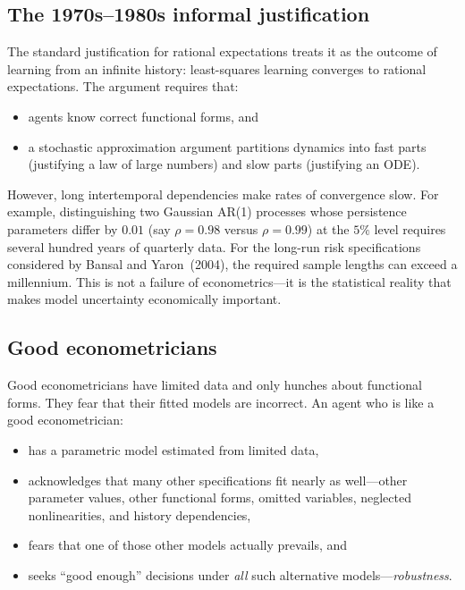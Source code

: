 \documentclass[12pt]{article}
\theoremstyle{definition}
\begin{document}
\subsection{The 1970s--1980s informal justification}

The standard justification for rational expectations treats it as the
outcome of learning from an infinite history: least-squares learning
converges to rational expectations.  The argument requires that:
\begin{itemize}
\item agents know correct functional forms, and
\item a stochastic approximation argument partitions dynamics into fast
      parts (justifying a law of large numbers) and slow parts
      (justifying an ODE).
\end{itemize}
However, long intertemporal dependencies make
{\color{red} rates of convergence slow}.
For example, distinguishing two Gaussian AR(1) processes whose
persistence parameters differ by $0.01$ (say $\rho = 0.98$ versus
$\rho = 0.99$) at the $5\%$ level requires several hundred years of
quarterly data.  For the long-run risk specifications considered by
Bansal and Yaron~(2004), the required sample lengths can exceed a
millennium.  This is not a failure of econometrics---it is the
statistical reality that makes model uncertainty economically important.

\subsection{Good econometricians}

Good econometricians have limited data and only hunches about functional
forms.  They fear that their fitted models are incorrect.  An agent who
is like a good econometrician:
\begin{itemize}
\item has a parametric model estimated from limited data,
\item acknowledges that many other specifications fit nearly as
      well---other parameter values, other functional forms, omitted
      variables, neglected nonlinearities, and history dependencies,
\item fears that one of those other models actually prevails, and
\item seeks ``good enough'' decisions under \emph{all} such alternative
      models---\emph{robustness}.
\end{itemize}
\end{document}
